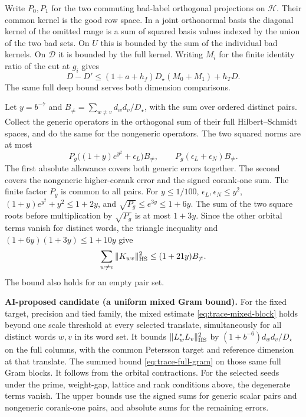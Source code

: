 \leavevmode{}%
Write \(P_0,P_1\) for the two commuting bad-label orthogonal
projections on \(\mathcal H\). Their common kernel is the good row
space. In a joint orthonormal basis the diagonal kernel of the
omitted range is a sum of squared basis values indexed by the union
of the two bad sets. On \(U\) this is bounded by the sum of the
individual bad kernels. On \(\mathscr D\) it is bounded by the full kernel.
Writing \(M_i\) for the finite identity ratio of the cut at \(g_i\)
gives
\begin{equation}
\label{eq:trace-omitted-row-mass}
 D-D'\le(1+a+h_f)D_\star(M_0+M_1)+h_TD.
\end{equation}
The same full deep bound serves both dimension comparisons.

\leavevmode{}%
\leavevmode{}%
Let \(y=b^{-7}\) and \(B_{\ne}=\sum_{w\ne v}d_wd_v/D_\star\),
with the sum over ordered distinct pairs. Collect the generic
operators in the orthogonal sum of their full Hilbert--Schmidt
spaces, and do the same for the nongeneric operators. The two
squared norms are at most
\[
 P_g\bigl((1+y)e^{y^2}+\epsilon_L\bigr)B_{\ne},\qquad
 P_g(\epsilon_L+\epsilon_N)B_{\ne}.
\]
The first absolute allowance covers both generic errors together.
The second covers the nongeneric higher-corank error and the signed
corank-one sum. The finite factor \(P_g\) is common to all pairs.
For \(y\le1/100\), \(\epsilon_L,\epsilon_N\le y^2\),
\((1+y)e^{y^2}+y^2\le1+2y\), and
\(\sqrt{P_g}\le e^{3y}\le1+6y\). The sum of the two square roots
before multiplication by \(\sqrt{P_g}\) is at most \(1+3y\).
Since the other orbital terms vanish for distinct words, the triangle
inequality and \((1+6y)(1+3y)\le1+10y\) give
\begin{equation}
\label{eq:trace-full-gram}
 \sum_{w\ne v}\|K_{wv}\|_{\rm HS}^2\le (1+21y)B_{\ne}.
\end{equation}
The bound also holds for an empty pair set.

%
\textbf{AI-proposed candidate (a uniform mixed Gram bound).}
For the fixed target, precision and tied family, the mixed estimate
\eqref{eq:trace-mixed-block} holds beyond one scale threshold at every
selected translate, simultaneously for all distinct words \(w,v\) in
its word set. It bounds \(\|L_w^*L_v\|_{\rm HS}^2\) by
\((1+b^{-6})d_wd_v/D_\star\) on the full columns, with the common
Petersson target and reference dimension at that translate.
{The summed bound \eqref{eq:trace-full-gram} on those same full
Gram blocks. It follows from the orbital contractions.}
For the selected seeds under the prime, weight-gap, lattice and rank
conditions above, the degenerate terms vanish. The upper bounds use
the signed sums for generic scalar pairs and nongeneric corank-one
pairs, and absolute sums for the remaining errors.

